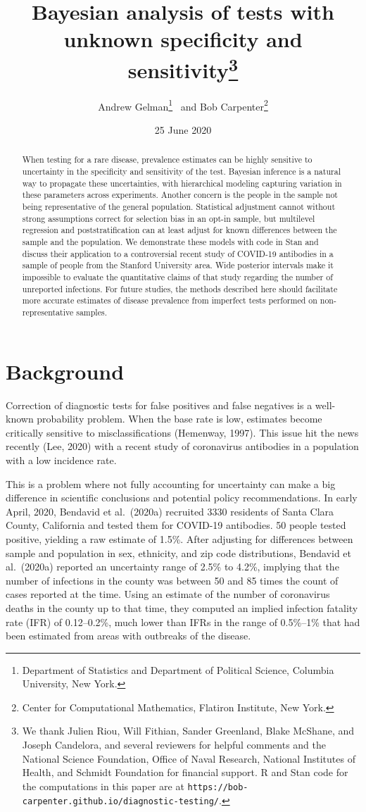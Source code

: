 \documentclass[11pt]{article}
\title{\bf Bayesian analysis of tests with unknown specificity and sensitivity\footnote{We thank Julien Riou, Will Fithian, Sander Greenland, Blake McShane, and Joseph Candelora, and several reviewers for helpful comments and the National Science Foundation, Office of Naval Research, National Institutes of Health, and Schmidt Foundation for financial support.  R and Stan code for the computations in this paper are at {\tt https://bob-carpenter.github.io/diagnostic-testing/}.}\vspace{.1in}}
\author{Andrew Gelman\footnote{Department of Statistics and Department of
Political Science, Columbia University, New York.}  \ and Bob Carpenter\footnote{Center for Computational Mathematics, Flatiron Institute, New York.}
\vspace{.1in}}
\date{25 June 2020}
\begin{document}
\sloppy
\maketitle

\begin{abstract}
\noindent
When testing for a rare disease, prevalence estimates can be highly sensitive to uncertainty in the specificity and sensitivity of the test.  Bayesian inference is a natural way to propagate these uncertainties, with hierarchical modeling capturing variation in these parameters across experiments.  Another concern is the people in the sample not being representative of the general population.  Statistical adjustment cannot without strong assumptions correct for selection bias in an opt-in sample, but multilevel regression and poststratification can at least adjust for known differences between the sample and the population.  We demonstrate these models with code in Stan and discuss their application to a controversial recent study of COVID-19 antibodies in a sample of people from the Stanford University area.  Wide posterior intervals make it impossible to evaluate the quantitative claims of that study regarding the number of unreported infections.  For future studies, the methods described here should facilitate more accurate estimates of disease prevalence from imperfect tests performed on non-representative samples.
\end{abstract}

\section{Background}

Correction of diagnostic tests for false positives and false negatives is a well-known probability problem.  When the base rate is low, estimates become critically sensitive to misclassifications (Hemenway, 1997).  This issue hit the news recently (Lee, 2020) with a recent study of coronavirus antibodies in a population with a low incidence rate.

This is a problem where not fully accounting for uncertainty can make a big difference in scientific conclusions and potential policy recommendations.  In early April, 2020, Bendavid et al.\ (2020a) recruited 3330 residents of Santa Clara County, California and tested them for COVID-19 antibodies.  50 people tested positive, yielding a raw estimate of 1.5\%.  After adjusting for differences between sample and population in sex, ethnicity, and zip code distributions, Bendavid et al.\ (2020a) reported an uncertainty range of 2.5\% to 4.2\%, implying that the number of infections in the county was between 50 and 85 times the count of cases reported at the time.  Using an estimate of the number of coronavirus deaths in the county up to that time, they computed an implied infection fatality rate (IFR) of 0.12--0.2\%, much lower than IFRs in the range of 0.5\%--1\% that had been estimated from areas with outbreaks of the disease.
\end{document}
